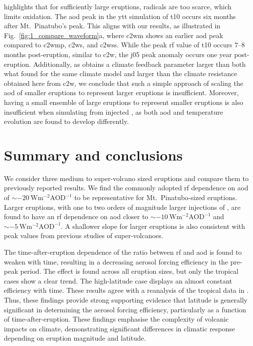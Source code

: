 \documentclass{ametsocV6.1}
\newcommand{\iso}[1][i]{{#1}njected \ce{SO2}}
\begin{document}
\citet{timmreck2010} highlights that for sufficiently large eruptions,  radicals
are too scarce, which limits  oxidation. The \gls{aod} peak in the \gls{ytt}
simulation of \gls{t10} occurs six months after Mt.\ Pinatubo's peak. This aligns with
our results, as illustrated in Fig.~\ref{fig:1_compare_waveform}a, where \gls{c2wm}
shows an earlier \gls{aod} peak compared to \gls{c2wmp}, \gls{c2ws}, and \gls{c2wss}.
While the peak \gls{rf} value of \gls{t10} occurs \(7\)--\(8\) months post-eruption,
similar to \gls{c2w}, the \gls{j05} peak anomaly occurs one year post-eruption.
Additionally, as \citet{jones2005} obtains a climate feedback parameter larger than both
what \citet{gregory2016} found for the same climate model and larger than the climate
resistance obtained here from \gls{c2w}, we conclude that such a simple approach of
scaling the \gls{aod} of smaller eruptions to represent larger eruptions is
insufficient. Moreover, having a small ensemble of large eruptions to represent smaller
eruptions is also insufficient when simulating from \iso{}, as both \gls{aod} and
temperature evolution are found to develop differently.

\section{Summary and conclusions}\label{sec:conclusions}

We consider three medium to super-volcano sized eruptions and compare them to previously
reported results. We find the commonly adopted \gls{rf} dependence on \gls{aod} of
\(\sim\SI{-20}{\watt\metre^{-2}\mathrm{AOD}^{-1}}\) to be representative for Mt.\
Pinatubo-sized eruptions. Larger eruptions, with one to two orders of magnitude larger
injections of \ce{SO2}, are found to have an \gls{rf} dependence on \gls{aod} closer to
\(\sim\SI{-10}{\watt\metre^{-2}\mathrm{AOD}^{-1}}\) and
\(\sim\SI{-5}{\watt\metre^{-2}\mathrm{AOD}^{-1}}\). A shallower slope for larger
eruptions is also consistent with peak values from previous studies of super-volcanoes.

The time-after-eruption dependence of the ratio between \gls{rf} and \gls{aod} is found
to weaken with time, resulting in a decreasing aerosol forcing efficiency in the
pre-peak period. The effect is found across all eruption sizes, but only the tropical
cases show a clear trend. The high-latitude case displays an almost constant efficiency
with time. These results agree with a reanalysis of the tropical data in
\citet{marshall2020dataset}. Thus, these findings provide strong supporting evidence
that latitude is generally significant in determining the aerosol forcing efficiency,
particularly as a function of time-after-eruption. These findings emphasise the
complexity of volcanic impacts on climate, demonstrating significant differences in
climatic response depending on eruption magnitude and latitude.
\end{document}
